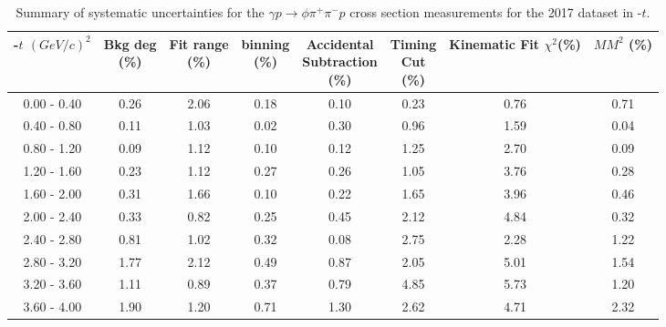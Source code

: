 \begin{center}
\begin{table}[!htbp]
    \small
    \centering
    \caption{Summary of systematic uncertainties for the $\gamma p \rightarrow \phi \pi^{+} \pi^{-} p$ cross section measurements for the 2017 dataset in -$t$.}
    \label{tab.y2175.syserr.phi2pi.2.2}
    \begin{tabular}{|c|c|c|c|c|c|c|c|}
        \hline
        -$t$ $(GeV/c)^{2}$&\thead{Bkg deg\\(\%)}&\thead{Fit range\\(\%)}&\thead{binning\\(\%)}&\thead{Accidental\\Subtraction\\(\%)}&\thead{Timing\\Cut\\(\%)}&\thead{Kinematic\\Fit $\chi^{2}$(\%)}&\thead{$MM^{2}$\\(\%)}\\
        \hline
        0.00 - 0.40 & 0.26 & 2.06 & 0.18 & 0.10 & 0.23 & 0.76 & 0.71 \\ 
        0.40 - 0.80 & 0.11 & 1.03 & 0.02 & 0.30 & 0.96 & 1.59 & 0.04 \\ 
        0.80 - 1.20 & 0.09 & 1.12 & 0.10 & 0.12 & 1.25 & 2.70 & 0.09 \\ 
        1.20 - 1.60 & 0.23 & 1.12 & 0.27 & 0.26 & 1.05 & 3.76 & 0.28 \\ 
        1.60 - 2.00 & 0.31 & 1.66 & 0.10 & 0.22 & 1.65 & 3.96 & 0.46 \\ 
        2.00 - 2.40 & 0.33 & 0.82 & 0.25 & 0.45 & 2.12 & 4.84 & 0.32 \\ 
        2.40 - 2.80 & 0.81 & 1.02 & 0.32 & 0.08 & 2.75 & 2.28 & 1.22 \\ 
        2.80 - 3.20 & 1.77 & 2.12 & 0.49 & 0.87 & 2.05 & 5.01 & 1.54 \\ 
        3.20 - 3.60 & 1.11 & 0.89 & 0.37 & 0.79 & 4.85 & 5.73 & 1.20 \\ 
        3.60 - 4.00 & 1.90 & 1.20 & 0.71 & 1.30 & 2.62 & 4.71 & 2.32 \\
        \hline
    \end{tabular}
\end{table}
\null
\vfill
\end{center}

